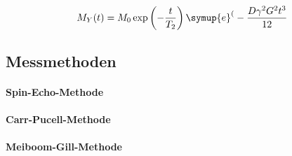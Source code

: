 \begin{align}
M_Y(t) = M_0\exp\left(-\frac{t}{T_2}\right)
\symup{e}^(-\frac{D\gamma^2 G^2 t^3}{12} \label{}
\end{align}

\subsection{Messmethoden}
\paragraph{Spin-Echo-Methode}
\paragraph{Carr-Pucell-Methode}
\paragraph{Meiboom-Gill-Methode}


\cite{sample}
